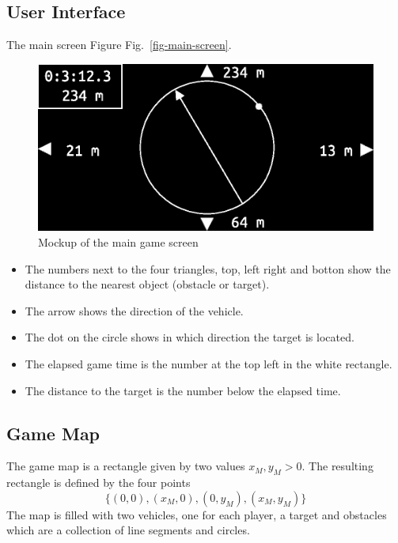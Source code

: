 \documentclass[11pt]{article}
\newcommand{\figref}[1]{Fig.~\eqref{#1}}
\begin{document}
\subsection{User Interface}
\label{sec-user-interface}
The main screen Figure \figref{fig-main-screen}.
\begin{figure}
    \includegraphics[width=\textwidth]{screen.eps}
\caption{Mockup of the main game screen}\label{fig-main-screen}
\end{figure}
\begin{itemize}
    \item The numbers next to the four triangles, top, left right and botton 
        show the distance to the nearest object (obstacle or target). 
    \item The arrow shows the direction of the vehicle. 
    \item The dot on the circle shows in which direction the target is 
        located.
    \item The elapsed game time is the number at the top left in the white
        rectangle.
    \item The distance to the target is the number below the elapsed time.
\end{itemize}

\subsection{Game Map}
\label{sec-game-map}
The game map is a rectangle given by two values $x_M, y_M > 0$. The resulting
rectangle is defined by the four points
\begin{equation*}
    \{(0,0), (x_M, 0), (0, y_M), (x_M, y_M)\} 
\end{equation*}
The map is filled with two vehicles, one for each player, a target and
obstacles which are a collection of line segments and circles.
\end{document}
